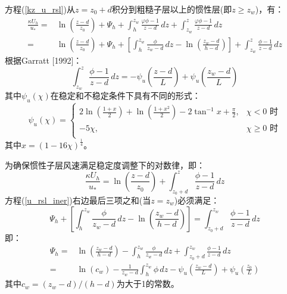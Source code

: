 方程(\ref{kz_u_rsl})从$z=z_0+d$积分到粗糙子层以上的惯性层(即$z\geq z_{w}$)，有：
\begin{align}\label{u_rsl_iner}
\frac{\kappa U_{h}}{u_{*}} =& \ln \left(\frac{z-d}{z_{0}}\right) + \Psi_{h} + \int_{h}^{z_{w}} \frac{\varphi \phi - 1}{z-d} \,dz
+ \int_{z_{w}}^{z} \frac{\varphi \phi - 1}{z-d} \,dz \nonumber \\[1ex]
=& \ln \left(\frac{z-d}{z_{0}}\right) + \Psi_{h} + \left[\int_{h}^{z_{w}} \frac{\phi}{z_{w}-d} \,dz - \ln \left(\frac{z_{w}-d}{h-d}\right) \right]
+ \int_{z_{w}}^{z} \frac{\phi - 1}{z-d} \,dz
\end{align}
根据Garratt [1992]：
\begin{equation}
\int_{z_{w}}^{z} \frac{\phi - 1}{z-d} \,dz = -\psi_u \left(\frac{z-d}{L} \right) + \psi_u \left(\frac{z_{w}-d}{L} \right)
\end{equation}
其中$\psi_u(\chi )$在稳定和不稳定条件下具有不同的形式：
\begin{equation}
   \psi_u(\chi ) = \begin{cases}
      2\ln \left(\frac{1+x}{2} \right) + \ln \left(\frac{1+x^2}{2} \right) - 2\tan^{-1}x + \frac {\pi}{2}, & \chi<0 \text { 时} \\[1ex]
      -5\chi, & \chi \geq 0 \text { 时} \\
\end{cases}
\end{equation}
其中$x=(1-16\chi)^{\frac{1}{4}}$。

为确保惯性子层风速满足稳定度调整下的对数律，即：
\begin{equation}\label{u_iner}
\frac{\kappa U_{h}}{u_{*}} = \ln \left(\frac{z-d}{z_{0}}\right) + \int_{z_{0}+d}^{z} \frac{\phi - 1}{z-d} \,dz
\end{equation}
方程(\ref{u_rsl_iner})右边最后三项之和(当$z=z_{w}$)必须满足：
\begin{equation}
\Psi_{h} + \left[\int_{h}^{z_{w}} \frac{\phi}{z_{w}-d} \,dz - \ln \left(\frac{z_{w}-d}{h-d}\right) \right] = \int_{z_{0}+d}^{z_{w}} \frac{\phi - 1}{z-d} \,dz
\end{equation}
即：
\begin{align}\label{Psih_general}
\Psi_{h} =& \ln \left(\frac{z_{w}-d}{h-d}\right) - \int_{h}^{z_{w}} \frac{\phi}{z_{w}-d} \,dz
+ \int_{z_{0}+d}^{z_{w}} \frac{\phi - 1}{z-d} \,dz \nonumber \\[1.5ex]
=& \ln \left(c_{w}\right) -\frac{1}{z_{w}-d} \int_{h}^{z_{w}} \phi \,dz - \psi_u \left(\frac{z_{w}-d}{L} \right)
+ \psi_u \left(\frac{z_{0}}{L} \right)
\end{align}
其中$c_{w}=(z_{w}-d)/(h-d)$为大于1的常数。

